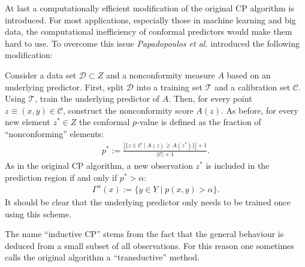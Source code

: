     At last a computationally efficient modification of the original CP algorithm is introduced. For most applications, especially those in machine learning and big data, the computational inefficiency of conformal predictors would make them hard to use. To overcome this issue \textit{Papadopoulos et al.} introduced the following modification:
    \begin{construct}[Inductive CP]
        Consider a data set $\mathcal{D}\subset Z$ and a nonconformity measure $A$ based on an underlying predictor. First, split $\mathcal{D}$ into a training set $\mathcal{T}$ and a calibration set $\mathcal{C}$. Using $\mathcal{T}$, train the underlying predictor of $A$. Then, for every point $z\equiv(x,y)\in\mathcal{C}$, construct the nonconformity score $A(z)$. As before, for every new element $z^*\in Z$ the conformal $p$-value is defined as the fraction of ``nonconforming'' elements:
        \begin{gather}
            \label{data:icp}
            p^* := \frac{|\{z\in\mathcal{C}\mid A(z)\geq A(z^*)\}|+1}{|\mathcal{C}|+1}.
       \end{gather}
        As in the original CP algorithm, a new observation $z^*$ is included in the prediction region if and only if $p^*>\alpha$:
        \begin{gather}
            \label{data:icp2}
            \Gamma^\alpha(x) := \{y\in Y\mid p(x,y)>\alpha\}.
        \end{gather}
        It should be clear that the underlying predictor only needs to be trained once using this scheme.
    \end{construct}
    \begin{remark}[Terminology]
        The name ``inductive CP'' stems from the fact that the general behaviour is deduced from a small subset of all observations. For this reason one sometimes calls the original algorithm a ``transductive'' method.
    \end{remark}

